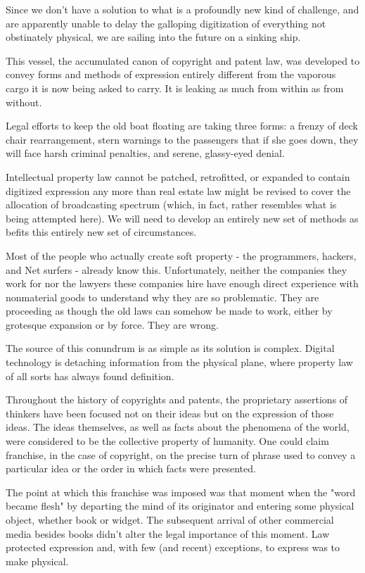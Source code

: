 \documentclass[
]{article}
\begin{document}
Since we don't have a solution to what is a profoundly new kind of
challenge, and are apparently unable to delay the galloping digitization
of everything not obstinately physical, we are sailing into the future
on a sinking ship.

This vessel, the accumulated canon of copyright and patent law, was
developed to convey forms and methods of expression entirely different
from the vaporous cargo it is now being asked to carry. It is leaking as
much from within as from without.

Legal efforts to keep the old boat floating are taking three forms: a
frenzy of deck chair rearrangement, stern warnings to the passengers
that if she goes down, they will face harsh criminal penalties, and
serene, glassy-eyed denial.

Intellectual property law cannot be patched, retrofitted, or expanded to
contain digitized expression any more than real estate law might be
revised to cover the allocation of broadcasting spectrum (which, in
fact, rather resembles what is being attempted here). We will need to
develop an entirely new set of methods as befits this entirely new set
of circumstances.

Most of the people who actually create soft property - the programmers,
hackers, and Net surfers - already know this. Unfortunately, neither the
companies they work for nor the lawyers these companies hire have enough
direct experience with nonmaterial goods to understand why they are so
problematic. They are proceeding as though the old laws can somehow be
made to work, either by grotesque expansion or by force. They are wrong.

The source of this conundrum is as simple as its solution is complex.
Digital technology is detaching information from the physical plane,
where property law of all sorts has always found definition.

Throughout the history of copyrights and patents, the proprietary
assertions of thinkers have been focused not on their ideas but on the
expression of those ideas. The ideas themselves, as well as facts about
the phenomena of the world, were considered to be the collective
property of humanity. One could claim franchise, in the case of
copyright, on the precise turn of phrase used to convey a particular
idea or the order in which facts were presented.

The point at which this franchise was imposed was that moment when the
"word became flesh" by departing the mind of its originator and entering
some physical object, whether book or widget. The subsequent arrival of
other commercial media besides books didn't alter the legal importance
of this moment. Law protected expression and, with few (and recent)
exceptions, to express was to make physical.
\end{document}
